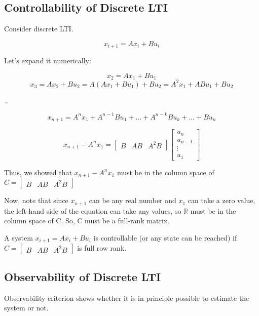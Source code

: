 \subsection{Controllability of Discrete LTI}
Consider discrete LTI.

\[x_{i+1} = Ax_i + Bu_i\]

Let's expand it numerically:

\[x_2 = Ax_1 + Bu_1\]
\[x_3 = Ax_2 + Bu_2 = A(Ax_1 + Bu_1) + Bu_2 = A^{2}x_1 + ABu_1 + Bu_2\]

\begin{center}
    \dots
\end{center}

\[x_{n+1} = A^{n}x_1 + A^{n-1}Bu_1 + ... + A^{n-k}Bu_k +...+ Bu_n\]


\[
x_{n+1} - A^{n}x_1 = \begin{bmatrix} B & AB & A^2B \end{bmatrix} \begin{bmatrix} u_n \\ u_{n-1} \\ \vdots \\ u_1 \end{bmatrix}
\]

Thus, we showed that $x_{n+1} - A^{n}x_1$ must be in the column space of $C = \begin{bmatrix} B & AB & A^2B \end{bmatrix}$

Now, note that since \( x_{n+1} \) can be any real number and \( x_1 \) can take a zero value, 
the left-hand side of the equation can take any values, so 
\( \mathbb{R} \) must be in the column space of C.
So, C must be a full-rank matrix. 


\begin{tcolorbox}[colback=green!10,colframe=green!50!black,title=\textbf{Controllability}]
    A system $x_{i+1} = Ax_i + Bu_i$ is controllable (or any state can be reached) if $C = \begin{bmatrix} B & AB & A^2B \end{bmatrix}$
    is full row rank.
\end{tcolorbox}


\subsection{Observability of Discrete LTI}

Observability criterion shows whether it is in principle possible to estimate the system or not. 


